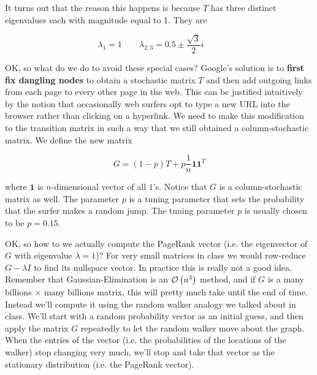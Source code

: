 \documentclass[12pt]{article}
\newcommand{\nin}{\noindent}
\newcommand{\vthree}{\vspace{3mm}}
\newcommand{\myp}[1]{\left( #1 \right)}
\begin{document}
\vthree

\nin It turns out that the reason this happens is because $T$ has three distinct eigenvalues each with magnitude equal to 1.  They are

\[
\lambda_1 = 1 \quad \quad
\lambda_{2,3} = 0.5 \pm \frac{\sqrt{3}}{2}i \quad \quad
\]

\vthree

\nin OK, so what do we do to avoid these special cases?  Google's solution is to {\bf first fix dangling nodes} to obtain a stochastic matrix $T$  and then add outgoing links from each page to every other page in the web.  This can be justified intuitively by the notion that occasionally web surfers opt to type a new URL into the browser rather than clicking on a hyperlink.  We need to make this modification to the transition matrix in such a way that we still obtained a column-stochastic matrix.  We define the new matrix

\[
G = \myp{1-p}T + p\frac{1}{n}\mathbf{1}\mathbf{1}^T
\]

\vthree

\nin where $\mathbf{1}$ is $n$-dimensional vector of all $1$'s. Notice that $G$ is a column-stochastic matrix as well.  The parameter $p$ is a tuning parameter that sets the probability that the surfer makes a random jump.  The tuning parameter $p$ is usually chosen to be $p = 0.15$.

\vthree

\nin {\bf Computing the PageRank Vector in Practice}

\vthree

\nin OK, so how to we actually compute the PageRank vector (i.e. the eigenvector of $G$ with eigenvalue $\lambda = 1$)?  For very small matrices in class we would row-reduce $G - \lambda I$ to find its nullspace vector.  In practice this is really not a good idea.  Remember that Gaussian-Elimination is an ${\cal O}\myp{n^3}$ method, and if $G$ is a many billions $\times$ many billions matrix, this will pretty much take until the end of time.  Instead we'll compute it using the random walker analogy we talked about in class.  We'll start with a random probability vector as an initial guess, and then apply the matrix $G$ repeatedly to let the random walker move about the graph.  When the entries of the vector (i.e. the probabilities of the locations of the walker) stop changing very much, we'll stop and take that vector as the stationary distribution (i.e. the PageRank vector).

\vthree
\end{document}
